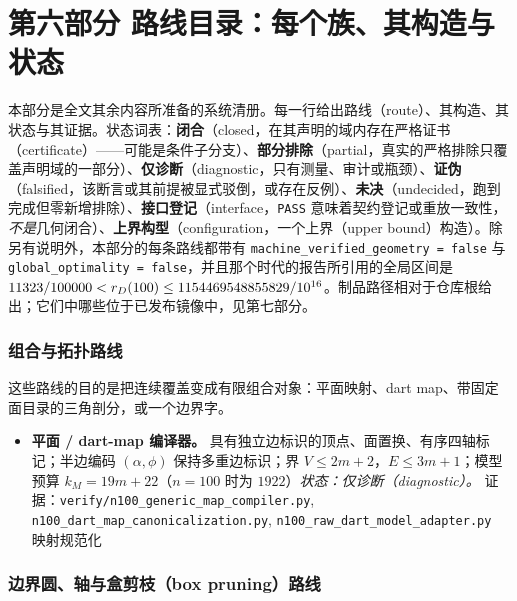 \part*{第六部分 路线目录：每个族、其构造与状态}
\setcounter{section}{0}

\noindent
本部分是全文其余内容所准备的系统清册。每一行给出路线（route）、其构造、其状态与其证据。状态词表：\textbf{闭合}（closed，在其声明的域内存在严格证书（certificate）——可能是条件子分支）、\textbf{部分排除}（partial，真实的严格排除只覆盖声明域的一部分）、\textbf{仅诊断}（diagnostic，只有测量、审计或瓶颈）、\textbf{证伪}（falsified，该断言或其前提被显式驳倒，或存在反例）、\textbf{未决}（undecided，跑到完成但零新增排除）、\textbf{接口登记}（interface，\texttt{PASS} 意味着契约登记或重放一致性，\emph{不是}几何闭合）、\textbf{上界构型}（configuration，一个上界（upper bound）构造）。除另有说明外，本部分的每条路线都带有 \texttt{machine\_\allowbreak{}verified\_\allowbreak{}geometry = false} 与 \texttt{global\_\allowbreak{}optimality = false}，并且那个时代的报告所引用的全局区间是 $11323/100000<r_{D}(100)\le1154469548855829/10^{16}$。制品路径相对于仓库根给出；它们中哪些位于已发布镜像中，见第七部分。

\section{组合与拓扑路线}

这些路线的目的是把连续覆盖变成有限组合对象：平面映射、dart map、带固定面目录的三角剖分，或一个边界字。

\begin{itemize}[leftmargin=1.2em,itemsep=3pt]
\item \textbf{平面 / dart-map 编译器。} 具有独立边标识的顶点、面置换、有序四轴标记；半边编码 $(\alpha,\phi)$ 保持多重边标识；界 $V\le2m+2$，$E\le3m+1$；模型预算 $k_M=19m+22$（$n=100$ 时为 $1922$）\emph{状态：仅诊断（diagnostic）。} 证据：\texttt{verify/\allowbreak{}n100\_\allowbreak{}generic\_\allowbreak{}map\_\allowbreak{}compiler.py}, \texttt{n100\_\allowbreak{}dart\_\allowbreak{}map\_\allowbreak{}canonicalization.py}, \texttt{n100\_\allowbreak{}raw\_\allowbreak{}dart\_\allowbreak{}model\_\allowbreak{}adapter.py} \\
映射规范化
\end{itemize}


\section{边界圆、轴与盒剪枝（box pruning）路线}

